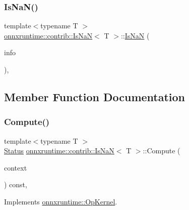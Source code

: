 \subsubsection{\texorpdfstring{Is\+Na\+N()}{IsNaN()}}
{\footnotesize\ttfamily template$<$typename T $>$ \\
\mbox{\hyperlink{classonnxruntime_1_1contrib_1_1IsNaN}{onnxruntime\+::contrib\+::\+Is\+NaN}}$<$ T $>$\+::\mbox{\hyperlink{classonnxruntime_1_1contrib_1_1IsNaN}{Is\+NaN}} (\begin{DoxyParamCaption}\item[{const \mbox{\hyperlink{classonnxruntime_1_1OpKernelInfo}{Op\+Kernel\+Info}} \&}]{info }\end{DoxyParamCaption})\hspace{0.3cm}{\ttfamily [inline]}, {\ttfamily [explicit]}}



\subsection{Member Function Documentation}
\mbox{\label{classonnxruntime_1_1contrib_1_1IsNaN_a0530ca099b975b2d8927060982428610}} 
\subsubsection{\texorpdfstring{Compute()}{Compute()}\hspace{0.1cm}{\footnotesize\ttfamily [1/2]}}
{\footnotesize\ttfamily template$<$typename T $>$ \\
\mbox{\hyperlink{classonnxruntime_1_1common_1_1Status}{Status}} \mbox{\hyperlink{classonnxruntime_1_1contrib_1_1IsNaN}{onnxruntime\+::contrib\+::\+Is\+NaN}}$<$ T $>$\+::Compute (\begin{DoxyParamCaption}\item[{\mbox{\hyperlink{classonnxruntime_1_1OpKernelContext}{Op\+Kernel\+Context}} $\ast$}]{context }\end{DoxyParamCaption}) const\hspace{0.3cm}{\ttfamily [override]}, {\ttfamily [virtual]}}



Implements \mbox{\hyperlink{classonnxruntime_1_1OpKernel_a9eca8656a78b1b3ab9d3351a12798650}{onnxruntime\+::\+Op\+Kernel}}.


